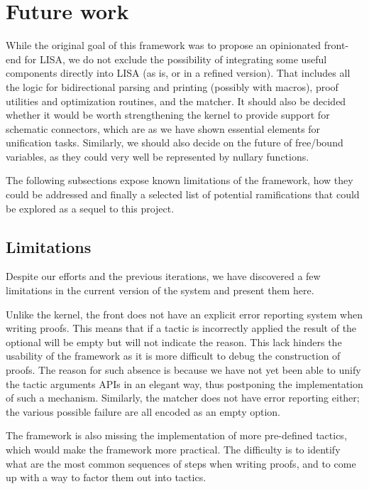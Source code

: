 \section{Future work}
\label{sec:future-work}

While the original goal of this framework was to propose an opinionated front-end for LISA, we do not exclude the possibility of integrating some useful components directly into LISA (as is, or in a refined version). That includes all the logic for bidirectional parsing and printing (possibly with macros), proof utilities and optimization routines, and the matcher. It should also be decided whether it would be worth strengthening the kernel to provide support for schematic connectors, which are as we have shown essential elements for unification tasks. Similarly, we should also decide on the future of free/bound variables, as they could very well be represented by nullary functions.

The following subsections expose known limitations of the framework, how they could be addressed and finally a selected list of potential ramifications that could be explored as a sequel to this project.

\subsection{Limitations}

Despite our efforts and the previous iterations, we have discovered a few limitations in the current version of the system and present them here.

Unlike the kernel, the front does not have an explicit error reporting system when writing proofs. This means that if a tactic is incorrectly applied the result of the optional will be empty but will not indicate the reason. This lack hinders the usability of the framework as it is more difficult to debug the construction of proofs. The reason for such absence is because we have not yet been able to unify the tactic arguments APIs in an elegant way, thus postponing the implementation of such a mechanism. Similarly, the matcher does not have error reporting either; the various possible failure are all encoded as an empty option.

The framework is also missing the implementation of more pre-defined tactics, which would make the framework more practical. The difficulty is to identify what are the most common sequences of steps when writing proofs, and to come up with a way to factor them out into tactics.

